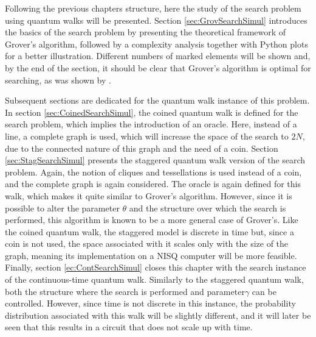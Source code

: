 \documentclass[../../dissertation.tex]{subfiles}
\begin{document}
Following the previous chapters structure, here the study of the search problem
using quantum walks will be presented. Section \ref{sec:GrovSearchSimul}
introduces the basics of the search problem by presenting the theoretical
framework of Grover's algorithm, followed by a complexity analysis together
with Python plots for a better illustration. Different numbers of marked
elements will be shown and, by the end of the section, it should be clear that
Grover's algorithm is optimal for searching, as was shown by \cite{zalka1999}.\par

Subsequent sections are dedicated for the quantum walk instance of this
problem. In section \ref{sec:CoinedSearchSimul}, the coined quantum
walk is defined for the search problem, which implies the introduction of an
oracle. Here, instead of a line, a complete graph is used, which will
increase the space of the search to $2N$, due to the connected nature of this
graph and the need of a coin. Section \ref{sec:StagSearchSimul} presents the
staggered quantum walk version of the search problem. Again, the notion of
cliques and tessellations is used instead of a coin, and the complete graph is
again considered. The oracle is again defined for this walk, which makes it
quite similar to Grover's algorithm. However, since it is possible to alter the
parameter $\theta$ and the structure over which the search is performed, this
algorithm is known to be a more general case of Grover's. Like the coined
quantum walk, the staggered model is discrete in time but, since a coin is not used,
the space associated with it scales only with the size of the graph, meaning
its implementation on a NISQ computer will be more feasible. Finally, section
\ref{ec:ContSearchSimul} closes this chapter with the search instance of the
continuous-time quantum walk. Similarly to the staggered quantum walk, both the
structure where the search is performed and parameter$\gamma$ can be
controlled. However, since time is not discrete in this instance, the
probability distribution associated with this walk will be slightly different,
and it will later be seen that this results in a circuit that does not scale up
with time.  
\end{document}
